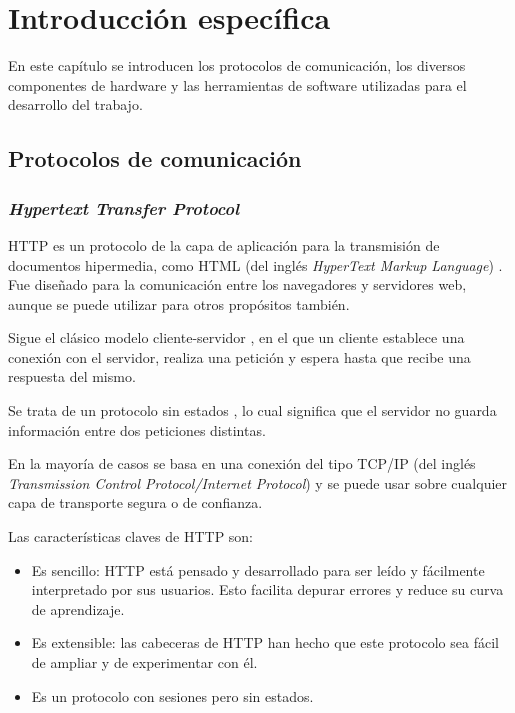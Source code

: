 \chapter{Introducción específica} %

\label{Chapter2}


En este capítulo se introducen los protocolos de comunicación, los diversos componentes de hardware y las herramientas de software utilizadas para el desarrollo del trabajo. 

\section{Protocolos de comunicación}

\subsection{\emph{Hypertext Transfer Protocol}}

HTTP es un protocolo de la capa de aplicación \citep{WEBSITE:CAPADEAPLICACION} para la transmisión de documentos hipermedia, como HTML (del inglés \textit{HyperText Markup Language}) \citep{WEBSITE:HTML}. Fue diseñado para la comunicación entre los navegadores y servidores web, aunque se puede utilizar para otros propósitos también. 

Sigue el clásico modelo cliente-servidor \citep{WEBSITE:CLIENTESERVIDOR}, en el que un cliente establece una conexión con el servidor, realiza una petición y espera hasta que recibe una respuesta del mismo. 

Se trata de un protocolo sin estados \citep{WEBSITE:PROTOCOLOSINESTADO}, lo cual significa que el servidor no guarda información entre dos peticiones distintas. 

En la mayoría de casos se basa en una conexión del tipo TCP/IP (del inglés \textit{Transmission Control Protocol/Internet Protocol}) \citep{WEBSITE:TCPIP} y se puede usar sobre cualquier capa de transporte \citep{WEBSITE:CAPADETRANSPORTE} segura o de confianza.

Las características claves de HTTP son:
\begin{itemize}
\item Es sencillo: HTTP está pensado y desarrollado para ser leído y fácilmente interpretado por sus usuarios. Esto facilita depurar errores y reduce su curva de aprendizaje.
\item Es extensible: las cabeceras de HTTP han hecho que este protocolo sea fácil de ampliar y de experimentar con él.
\item Es un protocolo con sesiones pero sin estados.
\end{itemize}

